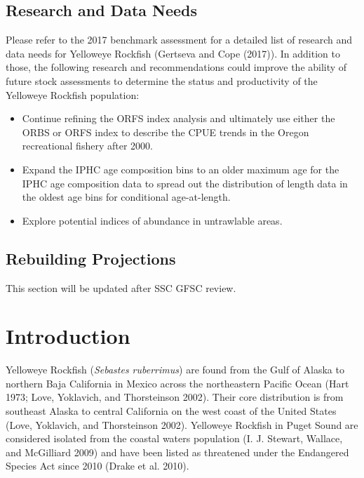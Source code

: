 \documentclass[
  english,
]{article}
\providecommand{\tightlist}{%
  \setlength{\itemsep}{0pt}\setlength{\parskip}{0pt}}
\begin{document}
\subsection*{Research and Data Needs}\label{research-and-data-needs}

Please refer to the 2017 benchmark assessment for a detailed list of
research and data needs for Yelloweye Rockfish (Gertseva and Cope
(2017)). In addition to those, the following research and
recommendations could improve the ability of future stock assessments to
determine the status and productivity of the Yelloweye Rockfish
population:

\begin{itemize}
\tightlist
\item
  Continue refining the ORFS index analysis and ultimately use either
  the ORBS or ORFS index to describe the CPUE trends in the Oregon
  recreational fishery after 2000.
\item
  Expand the IPHC age composition bins to an older maximum age for the
  IPHC age composition data to spread out the distribution of length
  data in the oldest age bins for conditional age-at-length.
\item
  Explore potential indices of abundance in untrawlable areas.
\end{itemize}

\subsection*{Rebuilding Projections}\label{rebuilding-projections}

This section will be updated after SSC GFSC review.

\pagebreak

\newpage{}

\setlength{\parskip}{5mm plus1mm minus1mm}
\setcounter{page}{1}
\setcounter{section}{0}
\renewcommand{\thefigure}{\arabic{figure}}
\renewcommand{\thetable}{\arabic{table}}
\setcounter{table}{0}
\setcounter{figure}{0}

\clearpage

\section{Introduction}\label{introduction}

Yelloweye Rockfish (\emph{Sebastes ruberrimus}) are found from the Gulf
of Alaska to northern Baja California in Mexico across the northeastern
Pacific Ocean (Hart 1973; Love, Yoklavich, and Thorsteinson 2002). Their
core distribution is from southeast Alaska to central California on the
west coast of the United States (Love, Yoklavich, and Thorsteinson
2002). Yelloweye Rockfish in Puget Sound are considered isolated from
the coastal waters population (I. J. Stewart, Wallace, and McGilliard
2009) and have been listed as threatened under the Endangered Species
Act since 2010 (Drake et al. 2010).
\end{document}
